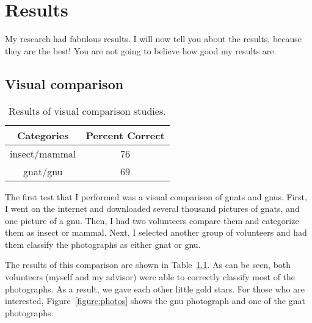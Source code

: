 \documentclass[12pt]{thesis}
\begin{document}
\chapter{Results}
My research had fabulous results. I will now tell you about
the results, because they are the best!  You are not going
to believe how good my results are.

\section{Visual comparison}

\begin{table}
\caption{Results of visual comparison studies.}
\begin{center}
  \begin{tabular}{|c|c|}
    \hline
    \bf Categories & \bf Percent Correct\\
    \hline
    \hline
    insect/mammal & 76\\
    \hline
    gnat/gnu & 69\\
    \hline
  \end{tabular}
\end{center}
\label{table:comp1}
\end{table}

The first test that I performed was a visual comparison of gnats and
gnus.  First, I went on the internet and downloaded several thousand
pictures of gnats, and one picture of a gnu.  Then, I had two
volunteers compare them and categorize them as insect
or mammal.
Next, I selected another group of volunteers and
had them classify the photographs as either gnat or gnu.


\begin{sidewaysfigure}
\begin{center}
\end{center}
\caption{Photographs of a gnu (left) and a gnat (right).}
\label{figure:photos}
\end{sidewaysfigure}

The results of this comparison are shown in Table~\ref{table:comp1}.
As can be seen, both volunteers (myself and my advisor) were able to
correctly classify most of the photographs.  As a result, we gave each
other little gold stars.
For those who are interested, Figure~\ref{figure:photos} shows the gnu
photograph and one of the gnat photographs.
\end{document}
